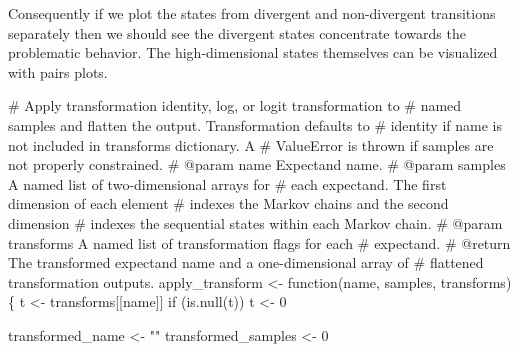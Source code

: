 \documentclass[
  letterpaper,
  DIV=11,
  numbers=noendperiod]{scrartcl}
\newenvironment{Shaded}{\begin{snugshade}}{\end{snugshade}}
\newcommand{\CommentTok}[1]{\textcolor[rgb]{0.37,0.37,0.37}{#1}}
\newcommand{\ControlFlowTok}[1]{\textcolor[rgb]{0.00,0.23,0.31}{#1}}
\newcommand{\DecValTok}[1]{\textcolor[rgb]{0.68,0.00,0.00}{#1}}
\newcommand{\KeywordTok}[1]{\textcolor[rgb]{0.00,0.23,0.31}{#1}}
\newcommand{\NormalTok}[1]{\textcolor[rgb]{0.00,0.23,0.31}{#1}}
\newcommand{\OperatorTok}[1]{\textcolor[rgb]{0.37,0.37,0.37}{#1}}
\newcommand{\StringTok}[1]{\textcolor[rgb]{0.13,0.47,0.30}{#1}}
\begin{document}
Consequently if we plot the states from divergent and non-divergent
transitions separately then we should see the divergent states
concentrate towards the problematic behavior. The high-dimensional
states themselves can be visualized with pairs plots.

\begin{Shaded}
\begin{Highlighting}[]
\CommentTok{\# Apply transformation identity, log, or logit transformation to}
\CommentTok{\# named samples and flatten the output.  Transformation defaults to }
\CommentTok{\# identity if name is not included in \textasciigrave{}transforms\textasciigrave{} dictionary.  A }
\CommentTok{\# ValueError is thrown if samples are not properly constrained.}
\CommentTok{\# @param name Expectand name.}
\CommentTok{\# @param samples A named list of two{-}dimensional arrays for }
\CommentTok{\#                each expectand.  The first dimension of each element }
\CommentTok{\#                indexes the Markov chains and the second dimension }
\CommentTok{\#                indexes the sequential states within each Markov chain.}
\CommentTok{\# @param transforms A named list of transformation flags for each }
\CommentTok{\#                   expectand.}
\CommentTok{\# @return The transformed expectand name and a one{-}dimensional array of}
\CommentTok{\#         flattened transformation outputs.}
\NormalTok{apply\_transform }\OperatorTok{\textless{}{-}}\NormalTok{ function(name, samples, transforms) \{}
\NormalTok{  t }\OperatorTok{\textless{}{-}}\NormalTok{ transforms[[name]]}
  \ControlFlowTok{if}\NormalTok{ (}\KeywordTok{is}\NormalTok{.null(t)) t }\OperatorTok{\textless{}{-}} \DecValTok{0}
  
\NormalTok{  transformed\_name }\OperatorTok{\textless{}{-}} \StringTok{""}
\NormalTok{  transformed\_samples }\OperatorTok{\textless{}{-}} \DecValTok{0}
 

\end{Highlighting}
\end{Shaded}
\end{document}
